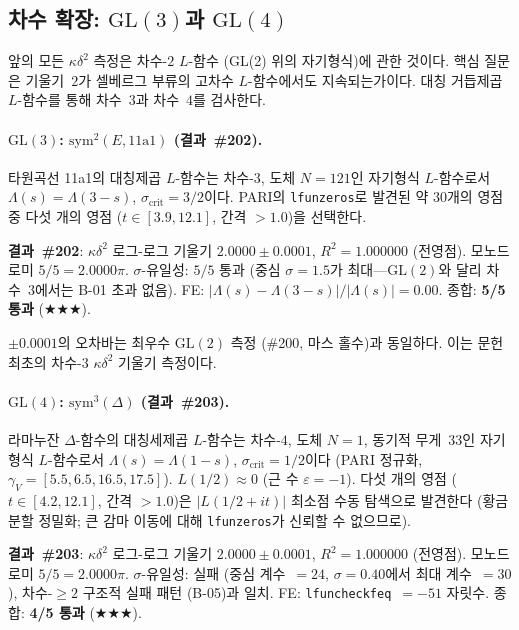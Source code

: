 \documentclass[11pt, a4paper]{article}
\theoremstyle{plain}
\theoremstyle{definition}
\begin{document}
\subsection{차수 확장: $\mathrm{GL}(3)$과 $\mathrm{GL}(4)$}
\label{ssec:degree_ext}

앞의 모든 $\kappa\delta^{2}$ 측정은 차수-$2$ $L$-함수
(GL(2) 위의 자기형식)에 관한 것이다.
핵심 질문은 기울기~$2$가 셀베르그 부류의 고차수 $L$-함수에서도
지속되는가이다. 대칭 거듭제곱 $L$-함수를 통해 차수~$3$과 차수~$4$를 검사한다.

\paragraph{$\mathrm{GL}(3)$: $\mathrm{sym}^{2}(E, \text{11a1})$
(결과~\#202).}
\label{par:gl3sym2}
타원곡선 11a1의 대칭제곱 $L$-함수는
차수-$3$, 도체 $N=121$인 자기형식 $L$-함수로서
$\Lambda(s)=\Lambda(3-s)$, $\sigma_{\mathrm{crit}}=3/2$이다.
PARI의 \texttt{lfunzeros}로 발견된 약 30개의 영점 중
다섯 개의 영점 ($t\in[3.9,12.1]$, 간격 $>1.0$)을 선택한다.

\medskip
\noindent\textbf{결과~\#202}: $\kappa\delta^{2}$ 로그-로그 기울기
$\mathbf{2.0000\pm 0.0001}$, $R^{2}=1.000000$ (전영점).
모노드로미 $5/5=2.0000\pi$.
$\sigma$-유일성: $5/5$ 통과
(중심 $\sigma=1.5$가 최대---$\mathrm{GL}(2)$와 달리 차수~$3$에서는
B-01 초과 없음).
FE: $|\Lambda(s)-\Lambda(3-s)|/|\Lambda(s)|=0.00$.
종합: \textbf{5/5 통과} ($\bigstar\bigstar\bigstar$).

$\pm 0.0001$의 오차바는 최우수 $\mathrm{GL}(2)$ 측정
(\#200, 마스 홀수)과 동일하다. 이는 문헌 최초의 차수-$3$
$\kappa\delta^{2}$ 기울기 측정이다.

\paragraph{$\mathrm{GL}(4)$: $\mathrm{sym}^{3}(\Delta)$
(결과~\#203).}
\label{par:gl4sym3}
라마누잔 $\Delta$-함수의 대칭세제곱 $L$-함수는
차수-$4$, 도체 $N=1$, 동기적 무게~$33$인 자기형식 $L$-함수로서
$\Lambda(s)=\Lambda(1-s)$, $\sigma_{\mathrm{crit}}=1/2$이다
(PARI 정규화, $\gamma_{V}=[5.5,6.5,16.5,17.5]$).
$L(1/2)\approx 0$ (근 수 $\varepsilon=-1$).
다섯 개의 영점 ($t\in[4.2,12.1]$, 간격 $>1.0$)은
$|L(1/2+it)|$ 최소점 수동 탐색으로 발견한다
(황금분할 정밀화; 큰 감마 이동에 대해 \texttt{lfunzeros}가
신뢰할 수 없으므로).

\medskip
\noindent\textbf{결과~\#203}: $\kappa\delta^{2}$ 로그-로그 기울기
$\mathbf{2.0000\pm 0.0001}$, $R^{2}=1.000000$ (전영점).
모노드로미 $5/5=2.0000\pi$.
$\sigma$-유일성: 실패 (중심 계수~$=24$, $\sigma=0.40$에서 최대 계수~$=30$),
차수-${\geq}2$ 구조적 실패 패턴 (B-05)과 일치.
FE: \texttt{lfuncheckfeq}~$=-51$ 자릿수.
종합: \textbf{4/5 통과} ($\bigstar\bigstar\bigstar$).
\end{document}
